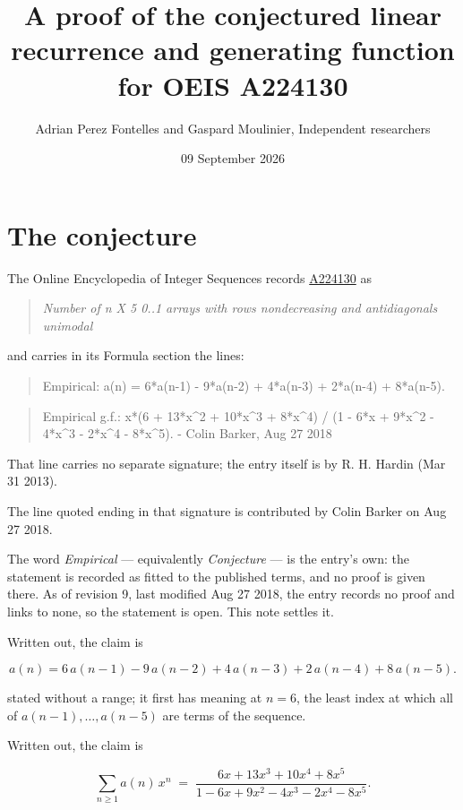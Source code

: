 \documentclass[11pt]{article}
\title{A proof of the conjectured linear recurrence and generating function for OEIS A224130}
\author{Adrian Perez Fontelles and Gaspard Moulinier, Independent researchers}
\date{09 September 2026}
\theoremstyle{definition}
\begin{document}
\maketitle
\section{The conjecture}

The Online Encyclopedia of Integer Sequences records \href{https://oeis.org/A224130}{A224130} as

\begin{quote}\itshape Number of n X 5 0..1 arrays with rows nondecreasing and antidiagonals unimodal\end{quote}

and carries in its Formula section the lines:

\begin{quote}\ttfamily Empirical: a(n) = 6*a(n-1) - 9*a(n-2) + 4*a(n-3) + 2*a(n-4) + 8*a(n-5).\end{quote}

\begin{quote}\ttfamily Empirical g.f.: x*(6 + 13*x\textasciicircum{}2 + 10*x\textasciicircum{}3 + 8*x\textasciicircum{}4) / (1 - 6*x + 9*x\textasciicircum{}2 - 4*x\textasciicircum{}3 - 2*x\textasciicircum{}4 - 8*x\textasciicircum{}5). - Colin Barker, Aug 27 2018\end{quote}

That line carries no separate signature; the entry itself is by R. H. Hardin (Mar 31 2013).

The line quoted ending in that signature is contributed by Colin Barker on Aug 27 2018.

The word {\itshape Empirical} --- equivalently {\itshape Conjecture} --- is the entry's own: the statement is recorded as fitted to the published terms, and no proof is given there. As of revision 9, last modified Aug 27 2018, the entry records no proof and links to none, so the statement is open. This note settles it.

Written out, the claim is

\[a(n) = 6\,a(n-1) - 9\,a(n-2) + 4\,a(n-3) + 2\,a(n-4) + 8\,a(n-5).\]

stated without a range; it first has meaning at $n = 6$, the least index at which all of $a(n-1),\dots,a(n-5)$ are terms of the sequence.

Written out, the claim is

\[\sum_{n \ge 1} a(n)\,x^n \;=\; \frac{6x + 13x^{3} + 10x^{4} + 8x^{5}}{1 - 6x + 9x^{2} - 4x^{3} - 2x^{4} - 8x^{5}}.\]
\end{document}
